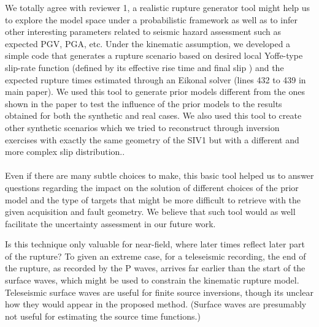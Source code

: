 \documentclass[10pt]{extarticle}
\begin{document}
%
\begin{Answer}
 We totally agree with reviewer 1, a realistic rupture generator tool might help us
 to explore the model space under a probabilistic framework as well as to infer other 
 interesting parameters related to seismic hazard assessment such as expected PGV, PGA, 
 etc. Under the kinematic assumption, we developed a simple code that generates a rupture 
 scenario based on desired local Yoffe-type slip-rate function (defined by its effective 
 rise time and final slip \citep{Tinti_2005_KSF}) and the expected rupture times estimated 
 through an Eikonal solver \citep{Podvin_1991_FDC} (lines 432 to 439 in main paper).
 We used this tool to generate prior models different from the ones shown in the paper to test 
 the influence of the prior models to the results obtained for both the synthetic and real cases.
 We also used this tool to create other synthetic scenarios which we tried to reconstruct
 through inversion exercises with exactly the same geometry of the SIV1 but with a different 
 and more complex slip distribution..\\
 \\
 Even if there are many subtle choices to make, this basic tool helped us to answer questions 
 regarding the impact on the solution of different choices of the prior model and the type 
 of targets that might be more difficult to retrieve with the given acquisition and fault 
 geometry. %
 We believe that such tool would as well facilitate the uncertainty assessment in our future work.\\
 \WorkInProgressRevTask
\end{Answer}
%
%
\begin{ReviewerComment}{1}
\noindent 
 Is this technique only valuable for near-field, where later times reflect later part of the
 rupture? To given an extreme case, for a teleseismic recording, the end of the rupture, as
 recorded by the P waves, arrives far earlier than the start of the surface waves, which might
 be used to constrain the kinematic rupture model.
 Teleseismic surface waves are useful for finite source inversions, though its unclear how
 they would appear in the proposed method. (Surface waves are presumably not useful for
 estimating the source time functions.)
\end{ReviewerComment}
\end{document}
